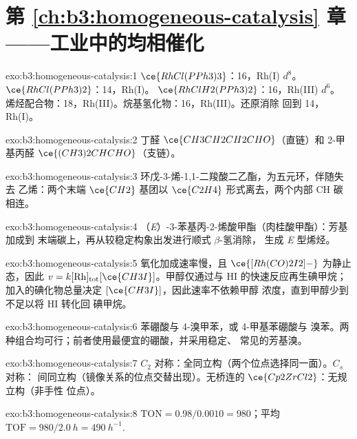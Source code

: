 \section*{第 \ref{ch:b3:homogeneous-catalysis} 章——工业中的均相催化}

\begin{solution}{exo:b3:homogeneous-catalysis:1}
$\ce{RhCl(PPh3)3}$：16，Rh(I) $d^8$。 $\ce{RhCl(PPh3)2}$：14，Rh(I)。 $\ce{RhClH2(PPh3)2}$：16，Rh(III) $d^6$。
烯烃配合物：18，Rh(III)。烷基氢化物：16，Rh(III)。还原消除
回到 14，Rh(I)。
\end{solution}

\begin{solution}{exo:b3:homogeneous-catalysis:2}
丁醛 $\ce{CH3CH2CH2CHO}$（直链）和 2-甲基丙醛 $\ce{(CH3)2CHCHO}$（支链）。
\end{solution}

\begin{solution}{exo:b3:homogeneous-catalysis:3}
环戊-3-烯-1,1-二羧酸二乙酯，为五元环，伴随失去
乙烯：两个末端 $\ce{CH2}$ 基团以 $\ce{C2H4}$ 形式离去，两个内部 CH 碳
相连。
\end{solution}

\begin{solution}{exo:b3:homogeneous-catalysis:4}
（\textit{E}）-3-苯基丙-2-烯酸甲酯（肉桂酸甲酯）：芳基加成到
末端碳上，再从较稳定构象出发进行顺式 $\beta$-氢消除，
生成 \textit{E} 型烯烃。
\end{solution}

\begin{solution}{exo:b3:homogeneous-catalysis:5}
氧化加成速率慢，且 $\ce{[Rh(CO)2I2]-}$ 为静止态，因此
$v = k[\mathrm{Rh}]_{\mathrm{tot}}[\ce{CH3I}]$。甲醇仅通过与 HI 的快速反应再生碘甲烷；
加入的碘化物总量决定 $[\ce{CH3I}]$，因此速率不依赖甲醇
浓度，直到甲醇少到不足以将 HI 转化回
碘甲烷。
\end{solution}

\begin{solution}{exo:b3:homogeneous-catalysis:6}
苯硼酸与 4-溴甲苯，或 4-甲基苯硼酸与
溴苯。两种组合均可行；前者使用最便宜的硼酸，并采用稳定、
常见的芳基溴。
\end{solution}

\begin{solution}{exo:b3:homogeneous-catalysis:7}
$C_2$ 对称：全同立构（两个位点选择同一面）。$C_s$ 对称：
间同立构（镜像关系的位点交替出现）。无桥连的 $\ce{Cp2ZrCl2}$：无规立构（非手性
位点）。
\end{solution}

\begin{solution}{exo:b3:homogeneous-catalysis:8}
$\mathrm{TON} = 0.98/0.0010 = 980$；平均 $\mathrm{TOF} = 980/\qty{2.0}{h} = \qty{490}{h^{-1}}$.
\end{solution}

